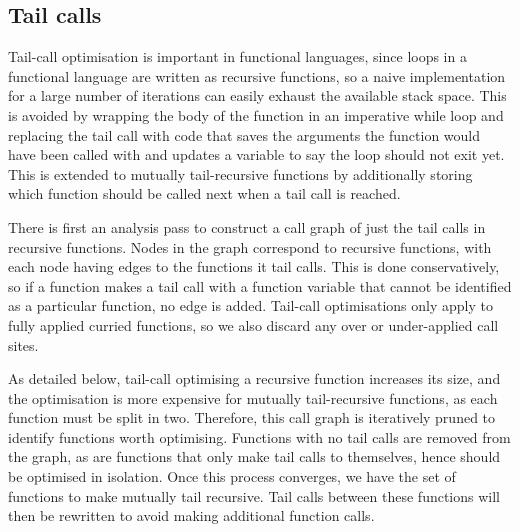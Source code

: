 \subsection{Tail calls}
Tail-call optimisation is important in functional languages, since loops in a functional language are written as recursive functions, so a naive implementation for a large number of iterations can easily exhaust the available stack space. This is avoided by wrapping the body of the function in an imperative while loop and replacing the tail call with code that saves the arguments the function would have been called with and updates a variable to say the loop should not exit yet. This is extended to mutually tail-recursive functions by additionally storing which function should be called next when a tail call is reached.

There is first an analysis pass to construct a call graph of just the tail calls in recursive functions. Nodes in the graph correspond to recursive functions, with each node having edges to the functions it tail calls. This is done conservatively, so if a function makes a tail call with a function variable that cannot be identified as a particular function, no edge is added.  Tail-call optimisations only apply to fully applied curried functions, so we also discard any over or under-applied call sites.



As detailed below, tail-call optimising a recursive function increases its size, and the optimisation is more expensive for mutually tail-recursive functions, as each function must be split in two. Therefore, this call graph is iteratively pruned to identify functions worth optimising. Functions with no tail calls are removed from the graph, as are functions that only make tail calls to themselves, hence should be optimised in isolation. Once this process converges, we have the set of functions to make mutually tail recursive. Tail calls between these functions will then be rewritten to avoid making additional function calls.

